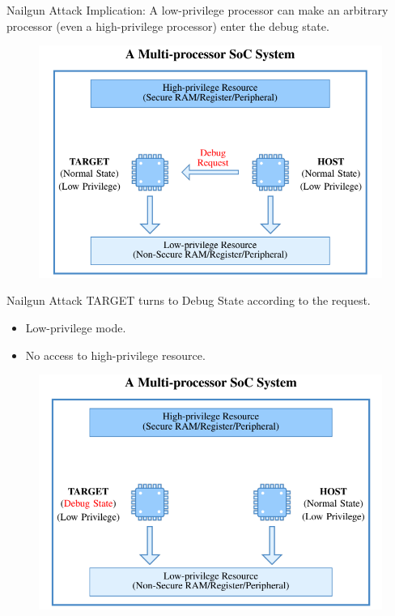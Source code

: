 \documentclass{beamer}
\begin{document}
\begin{frame}{Nailgun Attack}
    Implication: A low-privilege processor can make an arbitrary processor (even a high-privilege processor) enter the debug state.
    \begin{figure}
        \centering
        \includegraphics[scale=.40]{SUSTech-Beamer-Theme/pic/Nailgun5.png}
        \label{fig:my_label}
    \end{figure}
\end{frame}

\begin{frame}{Nailgun Attack}
    TARGET turns to Debug State according to the request.
\begin{itemize}
    \item Low-privilege mode.
    \item No access to high-privilege resource.
\end{itemize}
    \begin{figure}
        \centering
        \includegraphics[scale=.40]{SUSTech-Beamer-Theme/pic/Naigun6.png}
        \label{fig:my_label}
    \end{figure}
\end{frame}
\end{document}
